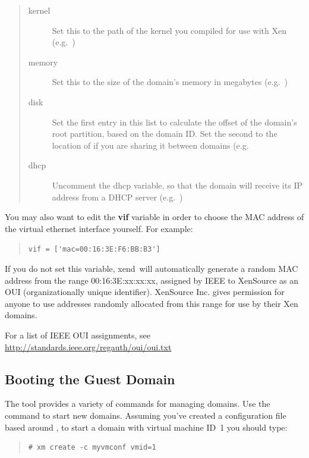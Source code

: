 \documentclass[11pt,twoside,final,openright]{report}
\def\xend{{xend}\xspace}
\begin{document}
\begin{quote}
\begin{description}
\item[kernel] Set this to the path of the kernel you compiled for use
  with Xen (e.g.\ )
\item[memory] Set this to the size of the domain's memory in megabytes
  (e.g.\ )
\item[disk] Set the first entry in this list to calculate the offset
  of the domain's root partition, based on the domain ID\@.  Set the
  second to the location of  if you are sharing it between
  domains (e.g.\ 
\item[dhcp] Uncomment the dhcp variable, so that the domain will
  receive its IP address from a DHCP server (e.g.\ )
\end{description}
\end{quote}

You may also want to edit the {\bf vif} variable in order to choose
the MAC address of the virtual ethernet interface yourself.  For
example:

\begin{quote}
\verb_vif = ['mac=00:16:3E:F6:BB:B3']_
\end{quote}
If you do not set this variable, \xend\ will automatically generate a
random MAC address from the range 00:16:3E:xx:xx:xx, assigned by IEEE to
XenSource as an OUI (organizationally unique identifier).  XenSource
Inc. gives permission for anyone to use addresses randomly allocated
from this range for use by their Xen domains.

For a list of IEEE OUI assignments, see 
\url{http://standards.ieee.org/regauth/oui/oui.txt} 


\subsection{Booting the Guest Domain}

The  tool provides a variety of commands for managing
domains.  Use the  command to start new domains. Assuming
you've created a configuration file  based around
, to start a domain with virtual machine
ID~1 you should type:

\begin{quote}
\begin{verbatim}
# xm create -c myvmconf vmid=1
\end{verbatim}
\end{quote}
\end{document}
